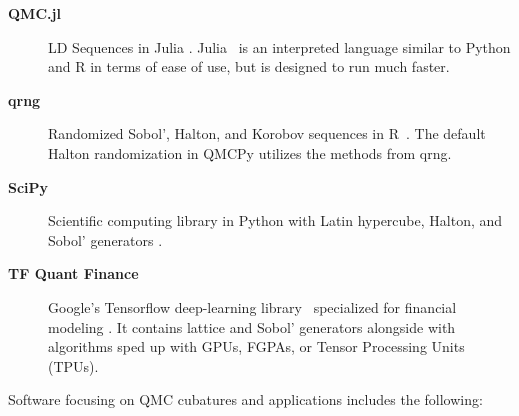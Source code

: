 \documentclass[graybox]{svmult}
\begin{document}
\begin{description}
	\item[\textbf{QMC.jl}] LD Sequences in Julia \cite{Rob20a}. Julia~\cite{bezanson2012julia} is an interpreted language similar to Python and R in terms of ease of use, but is designed to run much faster.
	\item[\textbf{qrng}] Randomized Sobol', Halton, and Korobov sequences in R~\cite{QRNG2020}. The default Halton randomization in QMCPy utilizes the methods from qrng. 
	\item[\textbf{SciPy}] Scientific computing library in Python with Latin hypercube,  Halton, and Sobol' generators \cite{2020SciPy-NMeth}.
	\item[\textbf{TF Quant Finance}] Google's Tensorflow  deep-learning library~\cite{tensorflow2015-whitepaper} specialized for financial modeling \cite{tfqf21}. It contains lattice and Sobol' generators alongside with algorithms sped up with GPUs, FGPAs, or Tensor Processing Units (TPUs).%
\end{description}
Software focusing on QMC cubatures and applications includes the following:
\end{document}
